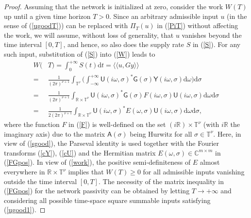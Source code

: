 \documentclass[letterpaper, 10pt, conference]{ieeeconf}  %
\def\>{\geqslant}           %
\def\mR{\mathbb{R}}    %
\def\mC{\mathbb{C}}    %
\def\dbra{\langle\!\!\langle}
\def\dket{\rangle\!\!\rangle}
\def\rd{\mathrm{d}}        %
\def\x{\times}
\def\sA{\mathsf{A}}
\def\sY{\mathsf{Y}}
\def\sU{\mathsf{U}}
\def\sG{\mathsf{G}}
\def\mT{\mathbb{T}}
\begin{document}
\begin{proof}
Assuming that the network is initialized at zero, consider the work $W(T)$ up until a given time horizon $T>0$. Since an arbitrary admissible input $u$ (in the sense of (\ref{ugoodT})) can be replaced with $\Pi_T(u)$ in (\ref{PiT}) without affecting the work, we will assume, without loss of generality, that $u$ vanishes beyond the time interval $[0,T]$, and hence, so also does the supply rate $S$ in (\ref{S}). For any such input, substitution of (\ref{S}) into (\ref{W}) leads to
\begin{align}
\nonumber
    W(&T)
    =
    \int_0^{+\infty}
    S(t)\rd t
    =
    \dbra
        u, Gy
    \dket\\
\nonumber
    = &
    \frac{1}
    {(2\pi)^{\nu+1}}
    \int_{\mT^\nu}
    \Big(
    \int_{-\infty}^{+\infty}
    \sU(i\omega,\sigma)^*
    \sG(\sigma)
    \sY(i\omega,\sigma)
    \rd \omega
    \Big)
    \rd \sigma\\
\nonumber
    = &
    \frac{1}
    {(2\pi)^{\nu+1}}
    \int_{\mR\x \mT^\nu}
    \sU(i\omega,\sigma)^*
    \sG(\sigma)
    F(i\omega,\sigma)
    \sU(i\omega,\sigma)
    \rd \omega
    \rd \sigma\\
\label{work}
    = &
    \frac{1}
    {2(2\pi)^{\nu+1}}
    \int_{\mR\x \mT^\nu}
    \sU(i\omega,\sigma)^*
    E(\omega,\sigma)
    \sU(i\omega,\sigma)
    \rd \omega
    \rd \sigma,
\end{align}
where the function $F$ in (\ref{F}) is well-defined on the set $(i\mR)\x \mT^\nu$ (with $i\mR$ the imaginary axis) due to the matrix $\sA(\sigma)$ being Hurwitz for all $\sigma \in \mT^\nu$.
Here, in view of  (\ref{sgood}), the Parseval identity is used together with the Fourier transforms (\ref{cY}), (\ref{cU}) and the Hermitian matrix $E(\omega,\sigma) \in \mC^{m\x m}$ in (\ref{FGpos}).
In view of (\ref{work}), the positive semi-definiteness of $E$ almost everywhere in $\mR\x \mT^{\nu}$ implies that $W(T)\> 0$ for all admissible inputs vanishing outside the time interval $[0,T]$. The necessity of the matrix inequality in (\ref{FGpos}) for the network passivity can be obtained by letting $T\to +\infty$ and considering all possible time-space square summable inputs satisfying (\ref{ugood1}).
%
%

\end{proof}
\end{document}
